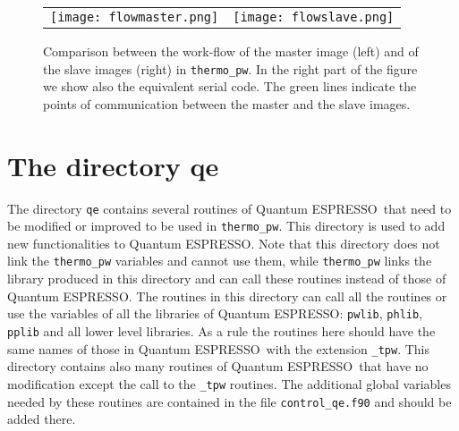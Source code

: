 \documentclass[12pt,a4paper]{article}
\def\qe{{\sc Quantum ESPRESSO}}
\begin{document}
\begin{figure*}[ht]
  \begin{tabular}[t]{ll}
    \texttt{[image: flowmaster.png]}
    &\texttt{[image: flowslave.png]}\\
  \end{tabular}
 \caption{Comparison between the work-flow of the master image (left)
 and of the slave images (right) in \texttt{thermo\_pw}. In the right
part of the figure we show also the equivalent serial code. The green lines
indicate the points of communication between the master and the slave images.
}
\label{figflow}
\end{figure*}

\newpage
\section{\color{coral}The directory qe}

The directory \texttt{qe} contains several routines of \qe\ that need to
be modified or improved to be used in \texttt{thermo\_pw}. This
directory is used to add new functionalities to \qe. Note that this directory
does not link the \texttt{thermo\_pw} variables and cannot use them, while
\texttt{thermo\_pw} links the library produced in this directory and can
call these routines instead of those of \qe. The routines in this directory
can call all the routines or use the variables of all the libraries
of \qe: \texttt{pwlib},
\texttt{phlib}, \texttt{pplib} and all lower level libraries.
As a rule the routines here should have the same names of those in \qe\ with
the extension \texttt{\_tpw}. This directory contains also many routines
of \qe\ that have no modification except the call to the \texttt{\_tpw}
routines. The additional global variables needed by these routines are
contained in the file \texttt{control\_qe.f90} and should be added there.
\end{document}
